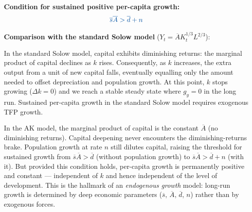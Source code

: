 \documentclass[letterpaper,12pt]{article}
\begin{document}
\textbf{Condition for sustained positive per-capita growth:}
\[
\textcolor{sol}{\overline{s}\overline{A} > \overline{d} + n}
\]

\textbf{Comparison with the standard Solow model} ($Y_t = \overline{A}K_t^{1/3}L^{2/3}$):

In the standard Solow model, capital exhibits diminishing returns: the marginal product of capital declines as $k$ rises. Consequently, as $k$ increases, the extra output from a unit of new capital falls, eventually equalling only the amount needed to offset depreciation and population growth. At this point, $k$ stops growing ($\Delta k = 0$) and we reach a stable steady state where $g_y = 0$ in the long run. Sustained per-capita growth in the standard Solow model requires exogenous TFP growth.

In the AK model, the marginal product of capital is the constant $\overline{A}$ (no diminishing returns). Capital deepening never encounters the diminishing-returns brake. Population growth at rate $n$ still dilutes capital, raising the threshold for sustained growth from $\overline{s}\overline{A} > \overline{d}$ (without population growth) to $\overline{s}\overline{A} > \overline{d} + n$ (with it). But provided this condition holds, per-capita growth is permanently positive and constant — independent of $k$ and hence independent of the level of development. This is the hallmark of an \emph{endogenous growth} model: long-run growth is determined by deep economic parameters ($\overline{s}$, $\overline{A}$, $\overline{d}$, $n$) rather than by exogenous forces.
\end{document}
